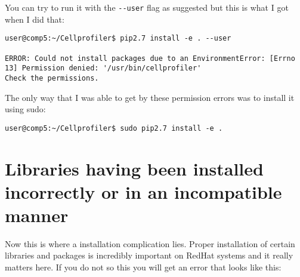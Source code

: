 \documentclass[
  letterpaper,
  DIV=11,
  numbers=noendperiod]{scrreprt}
\begin{document}
You can try to run it with the \texttt{-\/-user} flag as suggested but
this is what I got when I did that:

\begin{verbatim}
user@comp5:~/Cellprofiler$ pip2.7 install -e . --user

ERROR: Could not install packages due to an EnvironmentError: [Errno 13] Permission denied: '/usr/bin/cellprofiler'
Check the permissions.
\end{verbatim}

The only way that I was able to get by these permission errors was to
install it using sudo:

\begin{verbatim}
user@comp5:~/Cellprofiler$ sudo pip2.7 install -e .
\end{verbatim}

\hypertarget{libraries-having-been-installed-incorrectly-or-in-an-incompatible-manner}{%
\section*{\texorpdfstring{\textbf{Libraries having been installed
incorrectly or in an incompatible
manner}}{Libraries having been installed incorrectly or in an incompatible manner}}\label{libraries-having-been-installed-incorrectly-or-in-an-incompatible-manner}}

Now this is where a installation complication lies. Proper installation
of certain libraries and packages is incredibly important on RedHat
systems and it really matters here. If you do not so this you will get
an error that looks like this:
\end{document}
